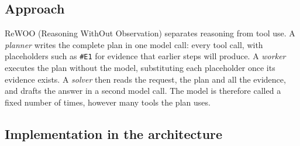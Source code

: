 \documentclass[11pt,letterpaper]{article}
\renewcommand{\_}{\textunderscore\allowbreak}
\begin{document}
\subsection*{Approach}
ReWOO (Reasoning WithOut Observation) separates reasoning from tool use. A \emph{planner} writes
the complete plan in one model call: every tool call, with placeholders such as
\texttt{\#E1} for evidence that earlier steps will produce. A \emph{worker} executes the plan
without the model, substituting each placeholder once its evidence exists. A \emph{solver} then
reads the request, the plan and all the evidence, and drafts the answer in a second model call.
The model is therefore called a fixed number of times, however many tools the plan uses.

\subsection*{Implementation in the architecture}
\end{document}
